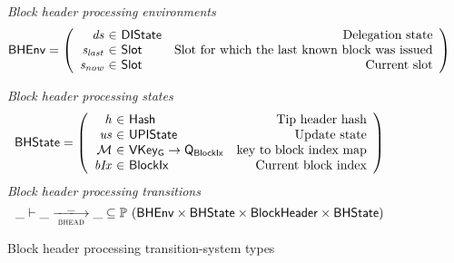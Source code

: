 \documentclass[11pt,a4paper]{article}
\newcommand{\powerset}[1]{\mathbb{P}~#1}
\newcommand{\var}[1]{\mathit{#1}}
\newcommand{\type}[1]{\mathsf{#1}}
\newcommand{\trans}[2]{\xlongrightarrow[\textsc{#1}]{#2}}
\newcommand{\totalf}{\to}
\newcommand{\Hash}{\type{Hash}}  %
\newcommand{\Slot}{\type{Slot}}
\newcommand{\BlockIx}{\type{BlockIx}}
\newcommand{\Queue}{\type{Q}}
\newcommand{\VKeyGen}{\type{VKey_G}}
\newcommand{\DelegState}{\type{DIState}}
\newcommand{\signmapname}{\mathcal{M}}
\begin{document}
\begin{figure}[ht]
  \emph{Block header processing environments}
  \begin{equation*}
    \BHEnv =
    \left(
      \begin{array}{r@{~\in~}lr}
        \var{ds} & \DelegState & \text{Delegation state} \\
        \var{s_{last}} & \Slot & \text{Slot for which the last known block was issued} \\
        \var{s_{now}} & \Slot & \text{Current slot} \\
      \end{array}
    \right)
  \end{equation*}

  \emph{Block header processing states}
  \begin{equation*}
    \BHState =
    \left(
      \begin{array}{r@{~\in~}lr}
        \var{h} & \Hash & \text{Tip header hash} \\
        \var{us} & \UPIState & \text{Update state} \\
        \signmapname & \VKeyGen \totalf \Queue_\BlockIx & \text{key to block index map} \\
        \var{bIx} & \BlockIx & \text{Current block index} \\
      \end{array}
    \right)
  \end{equation*}
  \emph{Block header processing transitions}
  \begin{equation*}
    \_ \vdash \var{\_} \trans{bhead}{\_} \var{\_} \subseteq
    \powerset (\BHEnv \times \BHState \times \Bhead \times \BHState)
  \end{equation*}
  \caption{Block header processing transition-system types}
  \label{fig:ts-types:bhead}
\end{figure}
\end{document}
